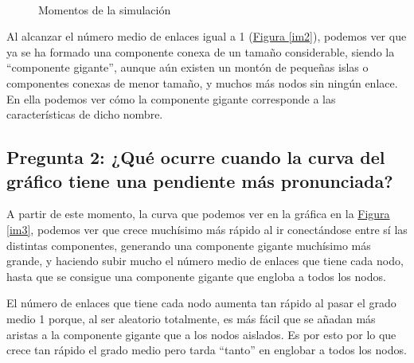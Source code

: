 \documentclass[paper=a4, fontsize=11pt]{article} %
\numberwithin{equation}{section} %
\numberwithin{figure}{section} %
\numberwithin{table}{section} %
\begin{document}
\begin{figure}[H]
    \centering
    \mbox{
        \qquad
    }
    \caption{Momentos de la simulación}
    \label{im_ej1}
\end{figure}

Al alcanzar el número medio de enlaces igual a 1 (\hyperref[im2]{Figura \ref{im2}}), podemos ver que ya se ha formado una componente conexa de un tamaño considerable, siendo la ``componente gigante'', aunque aún existen un montón de pequeñas islas o componentes conexas de menor tamaño, y muchos más nodos sin ningún enlace. En ella podemos ver cómo la componente gigante corresponde a las características de dicho nombre.

\subsection{Pregunta 2: ¿Qué ocurre cuando la curva del gráfico tiene una pendiente más pronunciada?}

A partir de este momento, la curva que podemos ver en la gráfica en la \hyperref[im3]{Figura \ref{im3}}, podemos ver que crece muchísimo más rápido al ir conectándose entre sí las distintas componentes, generando una componente gigante muchísimo más grande, y haciendo subir mucho el número medio de enlaces que tiene cada nodo, hasta que se consigue una componente gigante que engloba a todos los nodos.

El número de enlaces que tiene cada nodo aumenta tan rápido al pasar el grado medio 1 porque, al ser aleatorio totalmente, es más fácil que se añadan más aristas a la componente gigante que a los nodos aislados. Es por esto por lo que crece tan rápido el grado medio pero tarda ``tanto'' en englobar a todos los nodos.
\end{document}

